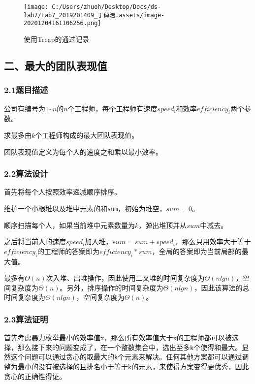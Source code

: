 \documentclass[]{article}
\begin{document}
\begin{figure}
\centering
\texttt{[image: C:/Users/zhuoh/Desktop/Docs/ds-lab7/Lab7\_2019201409\_于倬浩.assets/image-20201204161106256.png]}
\caption{使用Treap的通过记录}
\end{figure}

\hypertarget{header-n57}{%
\subsection{二、最大的团队表现值}\label{header-n57}}

\hypertarget{header-n58}{%
\subsubsection{2.1题目描述}\label{header-n58}}

公司有编号为\(1\)\textasciitilde{}\(n\)的\(n\)个工程师，每个工程师有速度\(speed_i\)和效率\(efficiency_i\)两个参数。

求最多由\(k\)个工程师构成的最大团队表现值。

团队表现值定义为每个人的速度之和乘以最小效率。

\hypertarget{header-n62}{%
\subsubsection{2.2算法设计}\label{header-n62}}

首先将每个人按照效率递减顺序排序。

维护一个小根堆以及堆中元素的和\texttt{sum}，初始为堆空，\(sum=0\)。

顺序扫描每个人，如果当前堆中元素数量为\(k\)，弹出堆顶并从\(sum\)中减去。

之后将当前人的速度\(speed_i\)加入堆，\(sum = sum + speed_i\)，那么只用效率大于等于\(efficiency_i\)的工程师的答案即为\(efficiency_i * sum\)，全局的答案即为当前局部的最大值。

最多有\(\Theta(n)\)次入堆、出堆操作，因此使用二叉堆的时间复杂度为\(\Theta(nlgn)\)，空间复杂度为\(\Theta(n)\)。另外，排序操作的时间复杂度为\(\Theta(nlgn)\)，因此该算法的总时间复杂度为\(\Theta(nlgn)\)，空间复杂度为\(\Theta(n)\)。

\hypertarget{header-n68}{%
\subsubsection{2.3算法证明}\label{header-n68}}

首先考虑暴力枚举最小的效率值x，那么所有效率值大于x的工程师都可以被选择，那么接下来的问题变成了，在一个整数集合中，选出至多\texttt{k}个使得和最大。显然这个问题可以通过贪心的取最大的\texttt{k}个元素来解决。任何其他方案都可以通过调整为最小的没有被选择的且排名小于等于k的元素，来使得方案变得更优秀，因此贪心的正确性得证。
\end{document}
